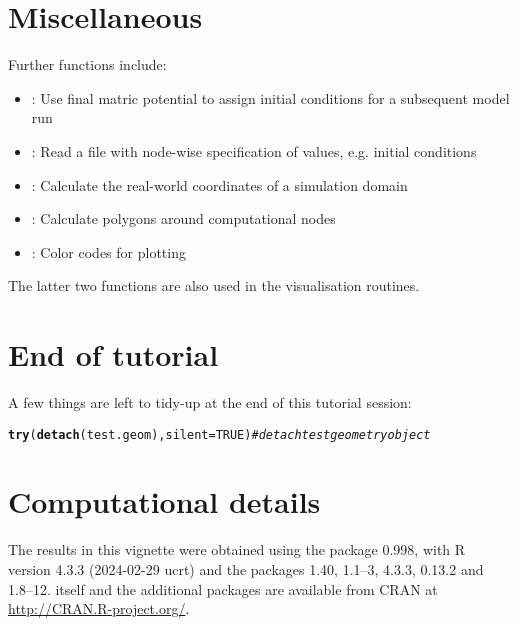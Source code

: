 \documentclass[article,nojss]{jss}\usepackage[]{graphicx}\usepackage[]{xcolor}
\makeatletter
\newcommand{\hlnum}[1]{\textcolor[rgb]{0.686,0.059,0.569}{#1}}%
\newcommand{\hlcom}[1]{\textcolor[rgb]{0.678,0.584,0.686}{\textit{#1}}}%
\newcommand{\hldef}[1]{\textcolor[rgb]{0.345,0.345,0.345}{#1}}%
\newcommand{\hlkwc}[1]{\textcolor[rgb]{0.333,0.667,0.333}{#1}}%
\newcommand{\hlkwd}[1]{\textcolor[rgb]{0.737,0.353,0.396}{\textbf{#1}}}%
\newenvironment{kframe}{%
 \def\at@end@of@kframe{}%
 \ifinner\ifhmode%
  \def\at@end@of@kframe{\end{minipage}}%
  \begin{minipage}{\columnwidth}%
 \fi\fi%
 \def\FrameCommand##1{\hskip\@totalleftmargin \hskip-\fboxsep
 \colorbox{shadecolor}{##1}\hskip-\fboxsep
     \hskip-\linewidth \hskip-\@totalleftmargin \hskip\columnwidth}%
 \MakeFramed {\advance\hsize-\width
   \@totalleftmargin\z@ \linewidth\hsize
   \@setminipage}}%
 {\par\unskip\endMakeFramed%
 \at@end@of@kframe}
\newenvironment{knitrout}{}{} %
\makeatother
\begin{document}
\section{Miscellaneous}

Further functions include:

\begin{itemize}
\item{: }{Use final matric potential to assign initial conditions for a subsequent model run}
\item{: }{Read a file with node-wise specification of values, e.g. initial conditions}
\item{: }{Calculate the real-world coordinates of a simulation domain}
\item{: }{Calculate polygons around computational nodes}
\item{: }{Color codes for plotting}
\end{itemize}
The latter two functions are also used in the visualisation routines.




\clearpage
\section*{End of tutorial}
A few things are left to tidy-up at the end of this tutorial session: 
\begin{knitrout}
\color{fgcolor}\begin{kframe}
\begin{alltt}
\hlkwd{try}\hldef{(}\hlkwd{detach}\hldef{(test.geom),} \hlkwc{silent}\hldef{=}\hlnum{TRUE}\hldef{)}  \hlcom{# detach test geometry object}
\end{alltt}
\end{kframe}
\end{knitrout}


\section*{Computational details}

The results in this vignette were obtained using the package 
 0.998,
with R version 4.3.3 (2024-02-29 ucrt) and the packages
 1.40,
 1.1--3,
 4.3.3,
 0.13.2 and
 1.8--12.
 itself and the additional packages are available from
CRAN at \url{http://CRAN.R-project.org/}.
\end{document}

